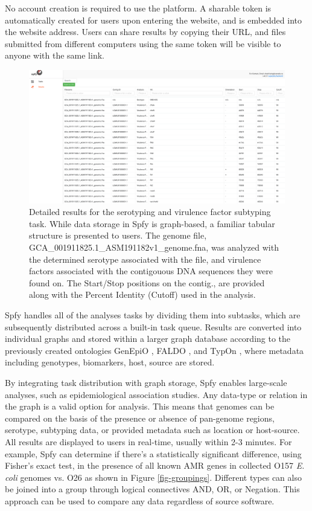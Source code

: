 \documentclass{article}
\begin{document}
No account creation is required to use the platform. A sharable token is automatically created for users upon entering the website, and is embedded into the website address. Users can share results by copying their URL, and files submitted from different computers using the same token will be visible to anyone with the same link.

\begin{figure}[!htb]
\begin{center}{}
\includegraphics[width=\textwidth]{images/tables.png}
\end{center}
\caption{Detailed results for the serotyping and virulence factor subtyping task. While data storage in Spfy is graph-based, a familiar tabular structure is presented to users. The genome file, GCA\_001911825.1\_ASM191182v1\_genome.fna, was analyzed with the determined serotype associated with the file, and virulence factors associated with the contigouous DNA sequences they were found on. The Start/Stop positions on the contig., are provided along with the Percent Identity (Cutoff) used in the analysis.}
\label{fig-tables}
\end{figure}

Spfy handles all of the analyses tasks by dividing them into subtasks, which are subsequently distributed across a built-in task queue. Results are converted into individual graphs and stored within a larger graph database according to the previously created ontologies GenEpiO \cite{griffiths2017context}, FALDO \cite{bolleman2016faldo}, and TypOn \cite{vaz2014typon}, where metadata including genotypes, biomarkers, host, source are stored.

By integrating task distribution with graph storage, Spfy enables large-scale analyses, such as epidemiological association studies. Any data-type or relation in the graph is a valid option for analysis. This means that genomes can be compared on the basis of the presence or absence of pan-genome regions, serotype, subtyping data, or provided metadata such as location or host-source. All results are displayed to users in real-time, usually within 2-3 minutes.
For example, Spfy can determine if there's a statistically significant difference, using Fisher's exact test, in the presence of all known AMR genes in collected O157 \textit{E. coli} genomes vs. O26 as shown in Figure \ref{fig-groupings}.
Different types can also be joined into a group through logical connectives AND, OR, or Negation. This approach can be used to compare any data regardless of source software.
\end{document}
